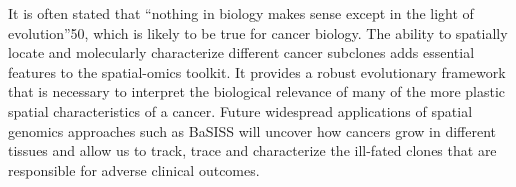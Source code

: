 It is often stated that “nothing in biology makes sense except in the light of evolution”50, which is likely to be true for cancer biology. The ability to spatially locate and molecularly characterize different cancer subclones adds essential features to the spatial-omics toolkit. It provides a robust evolutionary framework that is necessary to interpret the biological relevance of many of the more plastic spatial characteristics of a cancer. Future widespread applications of spatial genomics approaches such as BaSISS will uncover how cancers grow in different tissues and allow us to track, trace and characterize the ill-fated clones that are responsible for adverse clinical outcomes.

